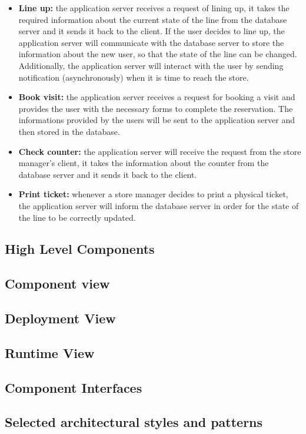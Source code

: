 \documentclass{article}
\begin{document}
\begin{itemize}
\item\textbf{Line up:} the application server receives a request of lining up, it takes the required information about the current state of the line from the database server and it sends it back to the client. If the user decides to line up, the application server will communicate with the database server to store the information about the new user, so that the state of the line can be changed. Additionally, the application server will interact with the user by sending notification (asynchronously) when it is time to reach the store.
\item\textbf{Book visit:} the application server receives a request for booking a visit and provides the user with the necessary forms to complete the reservation. The informations provided by the users will be sent to the application server and then stored in the database.
\item\textbf{Check counter:} the application server will receive the request from the store manager’s client, it takes the information about the counter from the database server and it sends it back to the client.
\item\textbf{Print ticket:} whenever a store manager decides to print a physical ticket, the application server will inform the database server in order for the state of the line to be correctly updated.
\end{itemize}
\subsection{High Level Components}
\subsection{Component view}
\subsection{Deployment View}
\subsection{Runtime View}
\subsection{Component Interfaces}
\subsection{Selected architectural styles and patterns}
\end{document}
